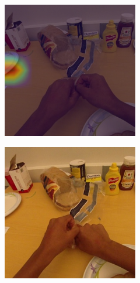 \documentclass[10pt,twocolumn,hidelinks,letterpaper]{article}
\begin{document}
\begin{figure}[t]
\begin{subfigure}{.32\linewidth}
  \end{subfigure}
  \begin{subfigure}{.32\linewidth}
  	\includegraphics[width=\linewidth]{images/Cams2/S2-take_hotdog/rgb0057_CAM_MS.png}
  \end{subfigure}
  \begin{subfigure}{.32\linewidth}
  	\includegraphics[width=\linewidth]{images/Cams2/S2-take_hotdog/rgb0076.png}

\end{subfigure}
\end{figure}
\end{document}
